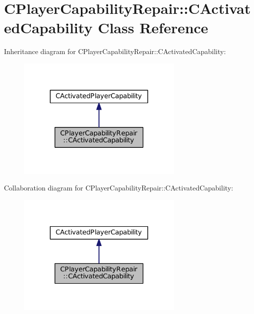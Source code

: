 \hypertarget{classCPlayerCapabilityRepair_1_1CActivatedCapability}{}\section{C\+Player\+Capability\+Repair\+:\+:C\+Activated\+Capability Class Reference}
\label{classCPlayerCapabilityRepair_1_1CActivatedCapability}


Inheritance diagram for C\+Player\+Capability\+Repair\+:\+:C\+Activated\+Capability\+:\nopagebreak
\begin{figure}[H]
\begin{center}
\leavevmode
\includegraphics[width=227pt]{classCPlayerCapabilityRepair_1_1CActivatedCapability__inherit__graph}
\end{center}
\end{figure}


Collaboration diagram for C\+Player\+Capability\+Repair\+:\+:C\+Activated\+Capability\+:\nopagebreak
\begin{figure}[H]
\begin{center}
\leavevmode
\includegraphics[width=227pt]{classCPlayerCapabilityRepair_1_1CActivatedCapability__coll__graph}
\end{center}
\end{figure}
